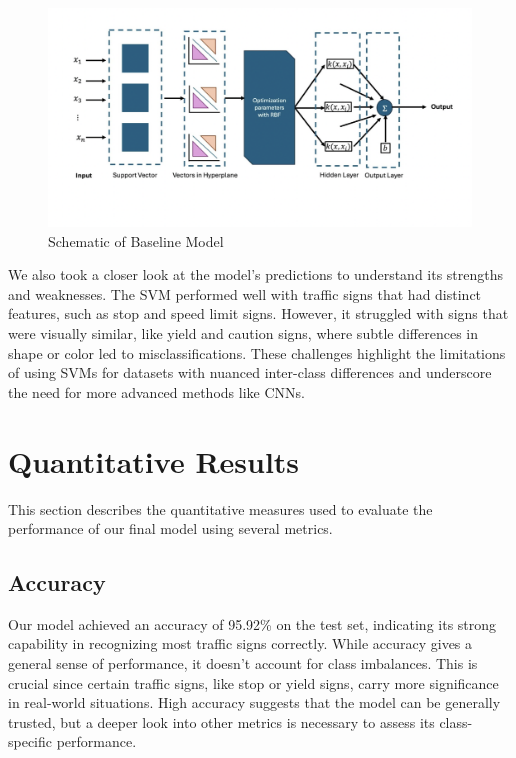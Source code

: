 \documentclass{article} %
\begin{document}
\begin{figure}[h]
    \centering
    \includegraphics[width=0.5\linewidth]{SVM Baseline Model.png}
    \caption{Schematic of Baseline Model}
    \label{fig:enter-label}
\end{figure}

We also took a closer look at the model’s predictions to understand its strengths and weaknesses. The SVM performed well with traffic signs that had distinct features, such as stop and speed limit signs. However, it struggled with signs that were visually similar, like yield and caution signs, where subtle differences in shape or color led to misclassifications. These challenges highlight the limitations of using SVMs for datasets with nuanced inter-class differences and underscore the need for more advanced methods like CNNs.

\section{Quantitative Results}
This section describes the quantitative measures used to evaluate the performance of our final model using several metrics. 
\subsection{Accuracy}
Our model achieved an accuracy of 95.92\% on the test set, indicating its strong capability in recognizing most traffic signs correctly. While accuracy gives a general sense of performance, it doesn’t account for class imbalances. This is crucial since certain traffic signs, like stop or yield signs, carry more significance in real-world situations. High accuracy suggests that the model can be generally trusted, but a deeper look into other metrics is necessary to assess its class-specific performance.
\end{document}

